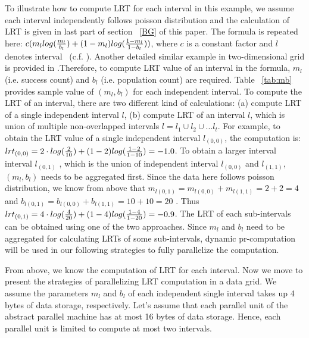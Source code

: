 \documentclass[AMA,LATO1COL]{WileyNJD-v2}
\begin{document}
To illustrate how to compute LRT for each interval in this example, we assume each interval independently follows poisson distribution and the calculation of LRT is given in last part of section ~\ref{BG} of this paper. The formula is repeated here: $c(m_l log ({m_l\over {b_l}})+ (1-m_l)log({{1-m_l}\over {1-b_l}}))$, where $c$ is a constant factor and $l$ denotes interval ~(c.f. \cite{DagMaxmize}). Another detailed similar example in two-dimensional grid is provided in \cite{dke}.Therefore, to compute LRT value of an interval in the formula, $m_l$ (i.e. success count) and $b_l$ (i.e. population count) are required. Table ~\ref{tab:mb} provides sample value of $(m_l,b_l)$ for each independent interval. To compute the LRT of an interval, there are two different kind of calculations: (a) compute LRT of a single independent interval $l$, (b) compute LRT of an interval $l$, which is union of multiple non-overlapped intervals $l=l_1\cup l_2\cup...l_t$. For example, to obtain the LRT value of a single independent interval $l_{(0,0)}$, the computation is: $lrt_{(0,0)}=2\cdot log({2\over 10})+(1-2)log({{1-2}\over {1-10}})=-1.0$.  To obtain a larger interval interval  $l_{(0,1)}$ , which is the union of independent interval $l_{(0,0)}$ and $l_{(1,1)}$,  $(m_l, b_l)$ needs to be aggregated first. Since the data here follows poisson distribution, we know from above that $m_{l(0,1)}=m_{l(0,0)}+m_{l(1,1)}=2+2=4$ and $b_{l(0,1)}=b_{l(0,0)}+b_{l(1,1)}=10+10=20$ . Thus $lrt_{(0,1)}=4\cdot log({4\over 20})+(1-4)log({{1-4}\over {1-20}})=-0.9$. The LRT of each sub-intervals can be obtained using one of the two approaches. Since $m_l$ and $b_l$ need to be aggregated for calculating LRTs of some sub-intervals, dynamic pr-computation will be used in our following strategies to fully parallelize the computation.

From above, we know the computation of LRT for each interval. Now we move to present the strategies of parallelizing LRT computation in a data grid.  We assume the parameters $m_l$ and $b_l$ of each independent single interval takes up 4 bytes of data storage, respectively. Let's assume that each parallel unit of the abstract parallel machine has at most 16 bytes of data storage. Hence, each parallel unit is limited to compute at most two intervals.
\end{document}
